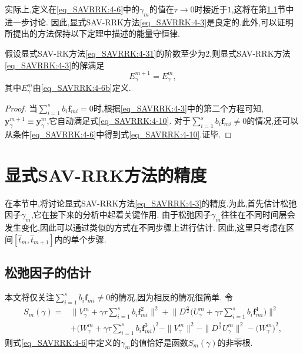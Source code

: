 实际上,定义在\eqref{eq_SAVRRK:4-6}中的$\gamma_m$的值在$\tau\rightarrow 0$时接近于$1$,这将在第\ref{Section_SAVRRK: 5-1}节中进一步讨论.
因此,显式SAV-RRK方法\eqref{eq_SAVRRK:4-3}是良定的.此外,可以证明所提出的方法保持以下定理中描述的能量守恒律.
\begin{theorem}
假设显式SAV-RK方法\eqref{eq_SAVRRK:4-31}的阶数至少为2,则显式SAV-RRK方法\eqref{eq_SAVRRK:4-3}的解满足
\begin{equation}
E_{\gamma}^{m+1}=E_{\gamma}^{m}, \label{eq_SAVRRK:4-10}
\end{equation}
其中$E_{\gamma}^{m}$由\eqref{eq_SAVRRK:4-6b}定义.
\end{theorem}

\begin{proof}
当$\sum\limits_{i=1}^s b_i \bm{f}_{m i}=0$时,根据\eqref{eq_SAVRRK:4-3}中的第二个方程可知, $\bm{y}_\gamma^{m+1}\equiv\bm{y}_\gamma^m$,它自动满足式\eqref{eq_SAVRRK:4-10}.
对于$\sum\limits_{i=1}^s b_i \bm{f}_{m i}\neq 0$的情况,还可以从条件\eqref{eq_SAVRRK:4-6}中得到式\eqref{eq_SAVRRK:4-10}.证毕.
\end{proof}

\section{显式SAV-RRK方法的精度}\label{Section_SAVRRK: 5}
在本节中,将讨论显式SAV-RRK方法\eqref{eq_SAVRRK:4-3}的精度.为此,首先估计松弛因子$\gamma_m$,它在接下来的分析中起着关键作用.
由于松弛因子$\gamma_m$往往在不同时间层会发生变化,因此可以通过类似的方式在不同步骤上进行估计.
因此,这里只考虑在区间$\left[\hat{t}_m, \hat{t}_{m+1}\right]$内的单个步骤.

\subsection{松弛因子的估计}\label{Section_SAVRRK: 5-1}

本文将仅关注$\sum\limits_{i=1}^s b_i \bm{f}_{m i} \neq 0$的情况,因为相反的情况很简单.
令
\begin{equation}
\begin{aligned}\label{eq_SAVRRK:sm}
S_m(\gamma)=&\big\|V_\gamma^m+\gamma \tau \sum\limits_{i=1}^s b_i \bm{f}_{m i}^2\big\|^2 + \big\|D^\frac{\alpha}{2} \big(U_\gamma^m+\gamma \tau \sum\limits_{i=1}^s b_i \bm{f}_{m i}^1\big)\big\|^2\\
&+\big(W_\gamma^m+\gamma \tau \sum\limits_{i=1}^s b_i \bm{f}_{m i}^3\big)^2-\|V_\gamma^{m}\|^2 - \|D^\frac{\alpha}{2} U_\gamma^{m}\|^2-\big(W_\gamma^{m}\big)^2,
\end{aligned}
\end{equation}
则式\eqref{eq_SAVRRK:4-6}中定义的$\gamma_m$的值恰好是函数$S_m(\gamma)$的非零根.

